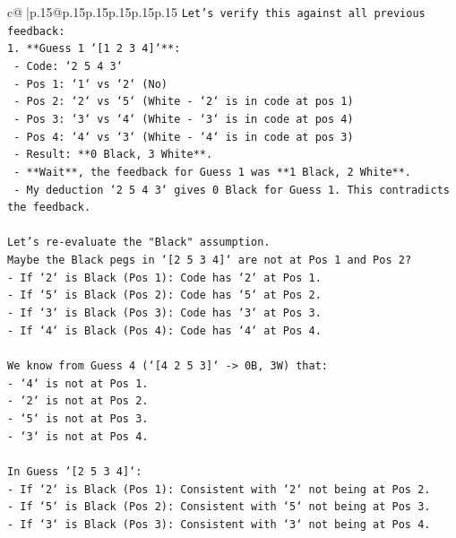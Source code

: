 \documentclass{article}
\begin{document}
{\begin{supertabular}{c@{$\;$}|p{.15\linewidth}@{}p{.15\linewidth}p{.15\linewidth}p{.15\linewidth}p{.15\linewidth}p{.15\linewidth}}
{{{\texttt{Let's verify this against all previous feedback:} \\
\texttt{1.  **Guess 1 `{[}1 2 3 4{]}`**:} \\
\texttt{    {-}   Code: `2 5 4 3`} \\
\texttt{    {-}   Pos 1: `1` vs `2` (No)} \\
\texttt{    {-}   Pos 2: `2` vs `5` (White {-} `2` is in code at pos 1)} \\
\texttt{    {-}   Pos 3: `3` vs `4` (White {-} `3` is in code at pos 4)} \\
\texttt{    {-}   Pos 4: `4` vs `3` (White {-} `4` is in code at pos 3)} \\
\texttt{    {-}   Result: **0 Black, 3 White**.} \\
\texttt{    {-}   **Wait**, the feedback for Guess 1 was **1 Black, 2 White**.} \\
\texttt{    {-}   My deduction `2 5 4 3` gives 0 Black for Guess 1. This contradicts the feedback.} \\
\\ 
\texttt{Let's re{-}evaluate the "Black" assumption.} \\
\texttt{Maybe the Black pegs in `{[}2 5 3 4{]}` are not at Pos 1 and Pos 2?} \\
\texttt{{-}   If `2` is Black (Pos 1): Code has `2` at Pos 1.} \\
\texttt{{-}   If `5` is Black (Pos 2): Code has `5` at Pos 2.} \\
\texttt{{-}   If `3` is Black (Pos 3): Code has `3` at Pos 3.} \\
\texttt{{-}   If `4` is Black (Pos 4): Code has `4` at Pos 4.} \\
\\ 
\texttt{We know from Guess 4 (`{[}4 2 5 3{]}` {-}> 0B, 3W) that:} \\
\texttt{{-}   `4` is not at Pos 1.} \\
\texttt{{-}   `2` is not at Pos 2.} \\
\texttt{{-}   `5` is not at Pos 3.} \\
\texttt{{-}   `3` is not at Pos 4.} \\
\\ 
\texttt{In Guess `{[}2 5 3 4{]}`:} \\
\texttt{{-}   If `2` is Black (Pos 1): Consistent with `2` not being at Pos 2.} \\
\texttt{{-}   If `5` is Black (Pos 2): Consistent with `5` not being at Pos 3.} \\
\texttt{{-}   If `3` is Black (Pos 3): Consistent with `3` not being at Pos 4.} \\
}}}
\end{supertabular}}
\end{document}

